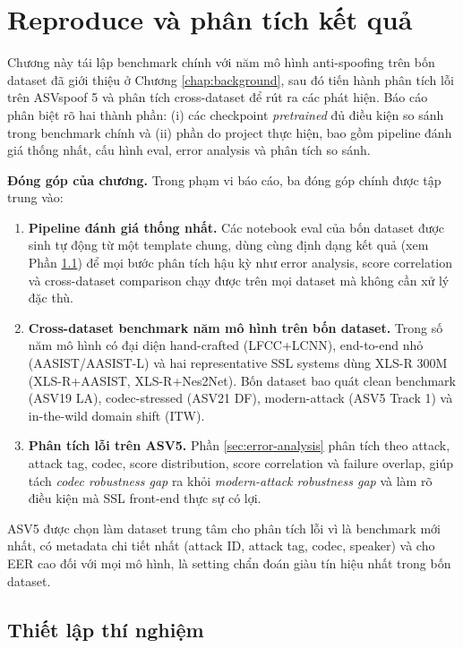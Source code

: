 ﻿\chapter{Reproduce và phân tích kết quả} \label{chap:experiment}

Chương này tái lập benchmark chính với năm mô hình anti-spoofing trên bốn dataset đã giới thiệu ở Chương \ref{chap:background}, sau đó tiến hành phân tích lỗi trên ASVspoof 5 và phân tích cross-dataset để rút ra các phát hiện. Báo cáo phân biệt rõ hai thành phần: (i) các checkpoint \textit{pretrained} đủ điều kiện so sánh trong benchmark chính và (ii) phần do project thực hiện, bao gồm pipeline đánh giá thống nhất, cấu hình eval, error analysis và phân tích so sánh.

\textbf{Đóng góp của chương.} Trong phạm vi báo cáo, ba đóng góp chính được tập trung vào:
\begin{enumerate}
    \item \textbf{Pipeline đánh giá thống nhất.} Các notebook eval của bốn dataset được sinh tự động từ một template chung, dùng cùng định dạng kết quả (xem Phần \ref{sec:experiment-setup}) để mọi bước phân tích hậu kỳ như error analysis, score correlation và cross-dataset comparison chạy được trên mọi dataset mà không cần xử lý đặc thù.
    \item \textbf{Cross-dataset benchmark năm mô hình trên bốn dataset.} Trong số năm mô hình có đại diện hand-crafted (LFCC+LCNN), end-to-end nhỏ (AASIST/AASIST-L) và hai representative SSL systems dùng XLS-R 300M (XLS-R+AASIST, XLS-R+Nes2Net). Bốn dataset bao quát clean benchmark (ASV19 LA), codec-stressed (ASV21 DF), modern-attack (ASV5 Track 1) và in-the-wild domain shift (ITW).
    \item \textbf{Phân tích lỗi trên ASV5.} Phần \ref{sec:error-analysis} phân tích theo attack, attack tag, codec, score distribution, score correlation và failure overlap, giúp tách \textit{codec robustness gap} ra khỏi \textit{modern-attack robustness gap} và làm rõ điều kiện mà SSL front-end thực sự có lợi.
\end{enumerate}

ASV5 được chọn làm dataset trung tâm cho phân tích lỗi vì là benchmark mới nhất, có metadata chi tiết nhất (attack ID, attack tag, codec, speaker) và cho EER cao đối với mọi mô hình, là setting chẩn đoán giàu tín hiệu nhất trong bốn dataset.

\section{Thiết lập thí nghiệm} \label{sec:experiment-setup}


